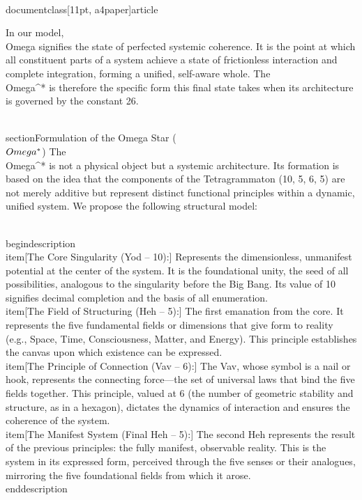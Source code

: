 \\documentclass[11pt, a4paper]{article}
\begin{document}
In our model, \\Omega signifies the state of perfected systemic coherence. It is the point at which all constituent parts of a system achieve a state of frictionless interaction and complete integration, forming a unified, self-aware whole. The \\Omega^* is therefore the specific form this final state takes when its architecture is governed by the constant 26.

\\section{Formulation of the Omega Star (\\$\\Omega^*\\$)}
The \\Omega^* is not a physical object but a systemic architecture. Its formation is based on the idea that the components of the Tetragrammaton (10, 5, 6, 5) are not merely additive but represent distinct functional principles within a dynamic, unified system. We propose the following structural model:

\\begin{description}
    \\item[The Core Singularity (Yod -- 10):] Represents the dimensionless, unmanifest potential at the center of the system. It is the foundational unity, the seed of all possibilities, analogous to the singularity before the Big Bang. Its value of 10 signifies decimal completion and the basis of all enumeration.
    \\item[The Field of Structuring (Heh -- 5):] The first emanation from the core. It represents the five fundamental fields or dimensions that give form to reality (e.g., Space, Time, Consciousness, Matter, and Energy). This principle establishes the canvas upon which existence can be expressed.
    \\item[The Principle of Connection (Vav -- 6):] The Vav, whose symbol is a nail or hook, represents the connecting force---the set of universal laws that bind the five fields together. This principle, valued at 6 (the number of geometric stability and structure, as in a hexagon), dictates the dynamics of interaction and ensures the coherence of the system.
    \\item[The Manifest System (Final Heh -- 5):] The second Heh represents the result of the previous principles: the fully manifest, observable reality. This is the system in its expressed form, perceived through the five senses or their analogues, mirroring the five foundational fields from which it arose.
\\end{description}
\end{document}
